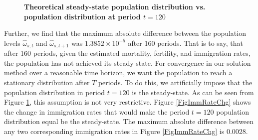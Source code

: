   \begin{figure}[htbp]\centering \captionsetup{width=4.0in}
    \caption{\label{FigOrigVsFixSSpop}\textbf{Theoretical steady-state population distribution vs. population distribution at period $t=120$}}
  \end{figure}

  Further, we find that the maximum absolute difference between the population levels $\hat{\omega}_{s,t}$ and $\hat{\omega}_{s,t+1}$ was $1.3852\times 10^{-5}$ after 160 periods. That is to say, that after 160 periods, given the estimated mortality, fertility, and immigration rates, the population has not achieved its steady state. For convergence in our solution method over a reasonable time horizon, we want the population to reach a stationary distribution after $T$ periods. To do this, we artificially impose that the population distribution in period $t=120$ is the steady-state. As can be seen from Figure \ref{FigOrigVsFixSSpop}, this assumption is not very restrictive. Figure \ref{FigImmRateChg} shows the change in immigration rates that would make the period $t=120$ population distribution equal be the steady-state. The maximum absolute difference between any two corresponding immigration rates in Figure \ref{FigImmRateChg} is 0.0028.

